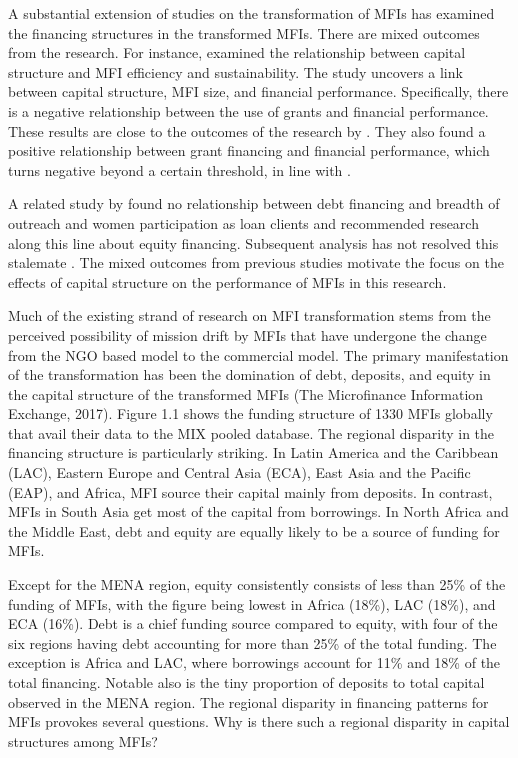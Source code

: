 \documentclass[a4paper, nobind]{templates/ociamthesis}
\begin{document}
A substantial extension of studies on the transformation of MFIs has examined the financing structures in the transformed MFIs. There are mixed outcomes from the research. For instance, \autocite{bogan2012capital} examined the relationship between capital structure and MFI efficiency and sustainability. The study uncovers a link between capital structure, MFI size, and financial performance. Specifically, there is a negative relationship between the use of grants and financial performance. These results are close to the outcomes of the research by \autocite{hudon2011efficiency}. They also found a positive relationship between grant financing and financial performance, which turns negative beyond a certain threshold, in line with \textcite{d2017ngos}.

A related study by \textcite{kar2012does} found no relationship between debt financing and breadth of outreach and women participation as loan clients and recommended research along this line about equity financing. Subsequent analysis has not resolved this stalemate \autocite{hoque2011commercialization,kyereboah2007determinants,khachatryan2017performance,d2017ngos}. The mixed outcomes from previous studies motivate the focus on the effects of capital structure on the performance of MFIs in this research.

Much of the existing strand of research on MFI transformation stems from the perceived possibility of mission drift by MFIs that have undergone the change from the NGO based model to the commercial model. The primary manifestation of the transformation has been the domination of debt, deposits, and equity in the capital structure of the transformed MFIs (The Microfinance Information Exchange, 2017). Figure 1.1 shows the funding structure of 1330 MFIs globally that avail their data to the MIX pooled database. The regional disparity in the financing structure is particularly striking. In Latin America and the Caribbean (LAC), Eastern Europe and Central Asia (ECA), East Asia and the Pacific (EAP), and Africa, MFI source their capital mainly from deposits. In contrast, MFIs in South Asia get most of the capital from borrowings. In North Africa and the Middle East, debt and equity are equally likely to be a source of funding for MFIs.

Except for the MENA region, equity consistently consists of less than 25\% of the funding of MFIs, with the figure being lowest in Africa (18\%), LAC (18\%), and ECA (16\%). Debt is a chief funding source compared to equity, with four of the six regions having debt accounting for more than 25\% of the total funding. The exception is Africa and LAC, where borrowings account for 11\% and 18\% of the total financing. Notable also is the tiny proportion of deposits to total capital observed in the MENA region. The regional disparity in financing patterns for MFIs provokes several questions. Why is there such a regional disparity in capital structures among MFIs?
\end{document}
